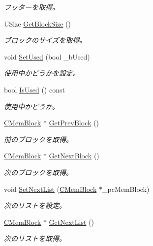 \begin{DoxyCompactItemize}
\begin{DoxyCompactList}\small\item\em フッターを取得。 \end{DoxyCompactList}\item 
U\+Size \hyperlink{class_c_mem_block_a5df8664b1d552d5cc8ef07becdb99a85}{Get\+Block\+Size} ()
\begin{DoxyCompactList}\small\item\em ブロックのサイズを取得。 \end{DoxyCompactList}\item 
void \hyperlink{class_c_mem_block_a017df5b011b6f0b004c452b32b9fbcfb}{Set\+Used} (bool \+\_\+b\+Used)
\begin{DoxyCompactList}\small\item\em 使用中かどうかを設定。 \end{DoxyCompactList}\item 
bool \hyperlink{class_c_mem_block_a30b4a6e486f8be24b8dc936a5452f05f}{Is\+Used} () const 
\begin{DoxyCompactList}\small\item\em 使用中かどうか。 \end{DoxyCompactList}\item 
\hyperlink{class_c_mem_block}{C\+Mem\+Block} $\ast$ \hyperlink{class_c_mem_block_a3e7914300806f8b7d668874a471d467b}{Get\+Prev\+Block} ()
\begin{DoxyCompactList}\small\item\em 前のブロックを取得。 \end{DoxyCompactList}\item 
\hyperlink{class_c_mem_block}{C\+Mem\+Block} $\ast$ \hyperlink{class_c_mem_block_af3d476af4fc4a7cae6e18c27984010dc}{Get\+Next\+Block} ()
\begin{DoxyCompactList}\small\item\em 次のブロックを取得。 \end{DoxyCompactList}\item 
void \hyperlink{class_c_mem_block_a95104d68bc16b334e102511ab31fa384}{Set\+Next\+List} (\hyperlink{class_c_mem_block}{C\+Mem\+Block} $\ast$\+\_\+pc\+Mem\+Block)
\begin{DoxyCompactList}\small\item\em 次のリストを設定。 \end{DoxyCompactList}\item 
\hyperlink{class_c_mem_block}{C\+Mem\+Block} $\ast$ \hyperlink{class_c_mem_block_a651ad72a34789a05c85f1b3f74fe63d2}{Get\+Next\+List} ()
\begin{DoxyCompactList}\small\item\em 次のリストを取得。 \end{DoxyCompactList}\item 

\end{DoxyCompactItemize}
